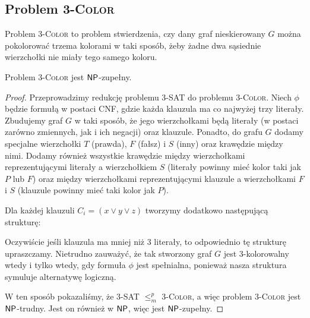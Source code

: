 \subsection{Problem 3-\textsc{Color}}

Problem 3-\textsc{Color} to problem stwierdzenia, czy dany graf nieskierowany $G$ można pokolorować trzema kolorami w taki sposób, żeby żadne dwa sąsiednie wierzchołki nie miały tego samego koloru.

\begin{theorem}
    Problem 3-\textsc{Color} jest $\textsf{NP}$-zupełny.
\end{theorem}
\begin{proof}
    Przeprowadzimy redukcję problemu 3-SAT do problemu 3-\textsc{Color}. Niech $\phi$ będzie formułą w postaci CNF, gdzie każda klauzula ma co najwyżej trzy literały. Zbudujemy graf $G$ w taki sposób, że jego wierzchołkami będą literały (w postaci zarówno zmiennych, jak i ich negacji) oraz klauzule.
    Ponadto, do grafu $G$ dodamy specjalne wierzchołki $T$ (prawda), $F$ (fałsz) i $S$ (inny) oraz krawędzie między nimi. Dodamy również wszystkie krawędzie między wierzchołkami reprezentującymi literały a wierzchołkiem $S$ (literały powinny mieć kolor taki jak $P$ lub $F$) oraz między wierzchołkami reprezentującymi klauzule a wierzchołkami $F$ i $S$ (klauzule powinny mieć taki kolor jak $P$).

    Dla każdej klauzuli $C_i = (x \lor y \lor z)$ tworzymy dodatkowo następującą strukturę:
    \begin{figure}[H]
        \centering
    \end{figure}

    Oczywiście jeśli klauzula ma mniej niż $3$ literały, to odpowiednio tę strukturę upraszczamy.
    Nietrudno zauważyć, że tak stworzony graf $G$ jest 3-kolorowalny wtedy i tylko wtedy, gdy formuła $\phi$ jest spełnialna, ponieważ nasza struktura symuluje alternatywę logiczną.

    W ten sposób pokazaliśmy, że 3-SAT $\leq_m^p$ 3-\textsc{Color}, a więc problem 3-\textsc{Color} jest $\textsf{NP}$-trudny. Jest on również w $\textsf{NP}$, więc jest $\textsf{NP}$-zupełny.
\end{proof}

